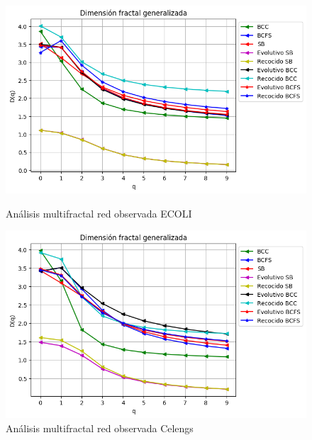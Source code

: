 \begin{figure}[!htb]
    \begin{minipage}{0.48\textwidth}
        \centering
        \includegraphics[scale=0.5]{CapituloAAnexos/imagenesAnexoC/Fractalidad/grafica_Dq20180504_000006EColi.png}
        \caption{Análisis multifractal red observada ECOLI}
    \end{minipage}\hfill
   \begin{minipage}{0.48\textwidth}
         \centering
        \includegraphics[scale=0.5]{CapituloAAnexos/imagenesAnexoC/Fractalidad/grafica_Dq20180504_010629Celengs.png}
    \caption{Análisis multifractal red observada Celengs}
    \end{minipage}
\end{figure}

